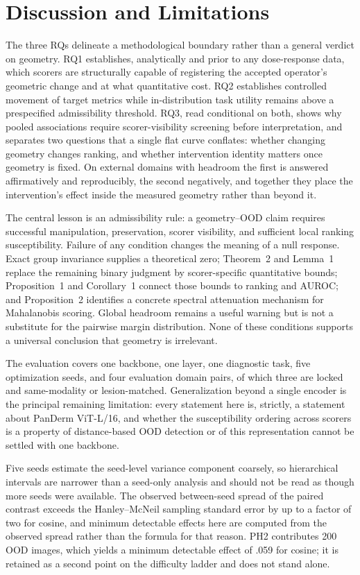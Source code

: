 \documentclass[11pt,a4paper]{article}
\begin{document}
\section{Discussion and Limitations}
The three RQs delineate a methodological boundary rather than a general verdict on geometry. RQ1 establishes, analytically and prior to any dose-response data, which scorers are structurally capable of registering the accepted operator's geometric change and at what quantitative cost. RQ2 establishes controlled movement of target metrics while in-distribution task utility remains above a prespecified admissibility threshold. RQ3, read conditional on both, shows why pooled associations require scorer-visibility screening before interpretation, and separates two questions that a single flat curve conflates: whether changing geometry changes ranking, and whether intervention identity matters once geometry is fixed. On external domains with headroom the first is answered affirmatively and reproducibly, the second negatively, and together they place the intervention's effect inside the measured geometry rather than beyond it.

The central lesson is an admissibility rule: a geometry--OOD claim requires successful manipulation, preservation, scorer visibility, and sufficient local ranking susceptibility. Failure of any condition changes the meaning of a null response. Exact group invariance supplies a theoretical zero; Theorem~2 and Lemma~1 replace the remaining binary judgment by scorer-specific quantitative bounds; Proposition~1 and Corollary~1 connect those bounds to ranking and AUROC; and Proposition~2 identifies a concrete spectral attenuation mechanism for Mahalanobis scoring. Global headroom remains a useful warning but is not a substitute for the pairwise margin distribution. None of these conditions supports a universal conclusion that geometry is irrelevant.

The evaluation covers one backbone, one layer, one diagnostic task, five optimization seeds, and four evaluation domain pairs, of which three are locked and same-modality or lesion-matched. Generalization beyond a single encoder is the principal remaining limitation: every statement here is, strictly, a statement about PanDerm ViT-L/16, and whether the susceptibility ordering across scorers is a property of distance-based OOD detection or of this representation cannot be settled with one backbone.

Five seeds estimate the seed-level variance component coarsely, so hierarchical intervals are narrower than a seed-only analysis and should not be read as though more seeds were available. The observed between-seed spread of the paired contrast exceeds the Hanley--McNeil sampling standard error by up to a factor of two for cosine, and minimum detectable effects here are computed from the observed spread rather than the formula for that reason. PH2 contributes 200 OOD images, which yields a minimum detectable effect of .059 for cosine; it is retained as a second point on the difficulty ladder and does not stand alone.
\end{document}
